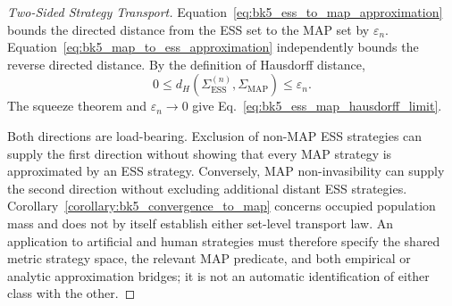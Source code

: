 \begin{proof}[Two-Sided Strategy Transport]
\label{proof:bk5_map_viability_critical_drift}
Equation~\eqref{eq:bk5_ess_to_map_approximation} bounds the directed distance
from the ESS set to the MAP set by $\varepsilon_n$.
Equation~\eqref{eq:bk5_map_to_ess_approximation} independently bounds the
reverse directed distance.  By the definition of Hausdorff distance,
\[
 0\leq d_H\!\left(\Sigma_{\mathrm{ESS}}^{(n)},
                   \Sigma_{\mathrm{MAP}}\right)
 \leq\varepsilon_n.
\]
The squeeze theorem and $\varepsilon_n\to0$ give
Eq.~\eqref{eq:bk5_ess_map_hausdorff_limit}.

Both directions are load-bearing.  Exclusion of non-MAP ESS strategies can
supply the first direction without showing that every MAP strategy is
approximated by an ESS strategy.  Conversely, MAP non-invasibility can supply
the second direction without excluding additional distant ESS strategies.
Corollary~\ref{corollary:bk5_convergence_to_map} concerns occupied population
mass and does not by itself establish either set-level transport law.  An
application to artificial and human strategies must therefore specify the
shared metric strategy space, the relevant MAP predicate, and both empirical
or analytic approximation bridges; it is not an automatic identification of
either class with the other.
\end{proof}
